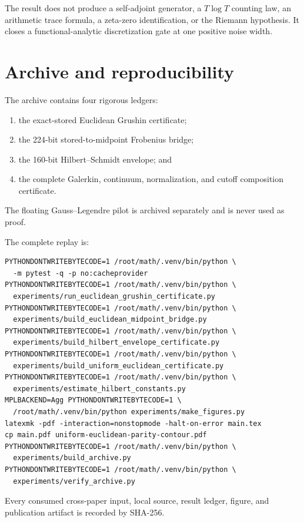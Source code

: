 \documentclass[11pt]{article}
\theoremstyle{definition}
\theoremstyle{remark}
\begin{document}
The result does not produce a self-adjoint generator, a
$T\log T$ counting law, an arithmetic trace formula, a zeta-zero
identification, or the Riemann hypothesis.  It closes a functional-analytic
discretization gate at one positive noise width.

\section{Archive and reproducibility}
\label{sec:archive}

The archive contains four rigorous ledgers:
\begin{enumerate}[leftmargin=2em]
 \item the exact-stored Euclidean Grushin certificate;
 \item the 224-bit stored-to-midpoint Frobenius bridge;
 \item the 160-bit Hilbert--Schmidt envelope; and
 \item the complete Galerkin, continuum, normalization, and cutoff
       composition certificate.
\end{enumerate}
The floating Gauss--Legendre pilot is archived separately and is never used
as proof.

The complete replay is:
\begin{verbatim}
PYTHONDONTWRITEBYTECODE=1 /root/math/.venv/bin/python \
  -m pytest -q -p no:cacheprovider
PYTHONDONTWRITEBYTECODE=1 /root/math/.venv/bin/python \
  experiments/run_euclidean_grushin_certificate.py
PYTHONDONTWRITEBYTECODE=1 /root/math/.venv/bin/python \
  experiments/build_euclidean_midpoint_bridge.py
PYTHONDONTWRITEBYTECODE=1 /root/math/.venv/bin/python \
  experiments/build_hilbert_envelope_certificate.py
PYTHONDONTWRITEBYTECODE=1 /root/math/.venv/bin/python \
  experiments/build_uniform_euclidean_certificate.py
PYTHONDONTWRITEBYTECODE=1 /root/math/.venv/bin/python \
  experiments/estimate_hilbert_constants.py
MPLBACKEND=Agg PYTHONDONTWRITEBYTECODE=1 \
  /root/math/.venv/bin/python experiments/make_figures.py
latexmk -pdf -interaction=nonstopmode -halt-on-error main.tex
cp main.pdf uniform-euclidean-parity-contour.pdf
PYTHONDONTWRITEBYTECODE=1 /root/math/.venv/bin/python \
  experiments/build_archive.py
PYTHONDONTWRITEBYTECODE=1 /root/math/.venv/bin/python \
  experiments/verify_archive.py
\end{verbatim}

Every consumed cross-paper input, local source, result ledger, figure, and
publication artifact is recorded by SHA-256.
\end{document}
